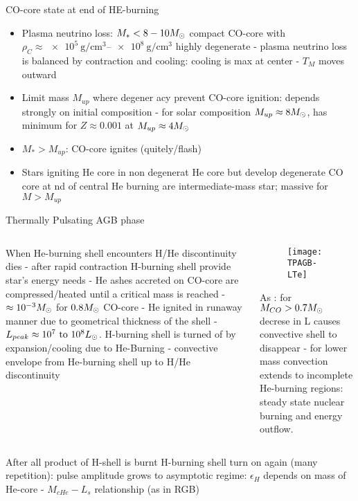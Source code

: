 \begin{frame}{CO-core state at end of HE-burning} 
\begin{itemize}
\item Plasma neutrino loss: $M_*<8-10M_{\odot}$ compact  CO-core with $\rho_C\approx\SIrange{e5}{e8}{\gram\per\cubic\cm}$ highly degenerate - plasma neutrino loss is balanced by contraction and cooling: cooling is max at center - $T_M$ moves outward
\item Limit mass $M_{up}$ where \Pelectron degener acy prevent CO-core ignition: depends strongly on initial composition - for solar composition $M_{up}\approx8M_{\odot}$, has minimum for $Z\approx0.001$ at $M_{up}\approx4M_{\odot}$
\item $M_*>M_{up}$: CO-core ignites (quitely/flash)
\item Stars igniting He core in non degenerat He core but develop degenerate CO core at nd of central He burning are intermediate-mass star; massive for $M>M_{up}$
\end{itemize}
\end{frame}
 
\begin{frame}{Thermally Pulsating AGB phase}
\begin{columns}[T]
	\begin{column}{0.45\textwidth}
 	When He-burning shell encounters H/He discontinuity dies - after rapid contraction H-burning shell provide star's energy needs - He ashes accreted on CO-core are compressed/heated until a critical mass is reached - $\approx\num{e-3}M_{\odot}$ for $0.8M_{\odot}$ CO-core - He ignited in runaway manner due to geometrical thickness of the shell - $L_{peak}\approx\numrange{e7}{e8}\lsun$.
	H-burning shell is turned of by expansion/cooling due to He-Burning - convective envelope from He-burning shell up to H/He discontinuity
	\end{column}
	\begin{column}{0.50\textwidth}
 		\begin{figure}[!ht]
			\texttt{[image: TPAGB-LTe]}\label{fig:TPAGB-LTe}
		\end{figure}
        As  : for $M_{CO}>0.7M_{\odot}$ decrese in L causes convective shell to disappear - for lower mass convection extends to incomplete He-burning regions: steady state nuclear burning and energy outflow.
\end{column}\end{columns}
After all product of H-shell is burnt H-burning shell turn on again (many repetition): pulse amplitude grows to asymptotic regime: $\epsilon_H$ depends on mass of He-core - $M_{cHe}-L_s$ relationship (as in RGB)
\end{frame}

